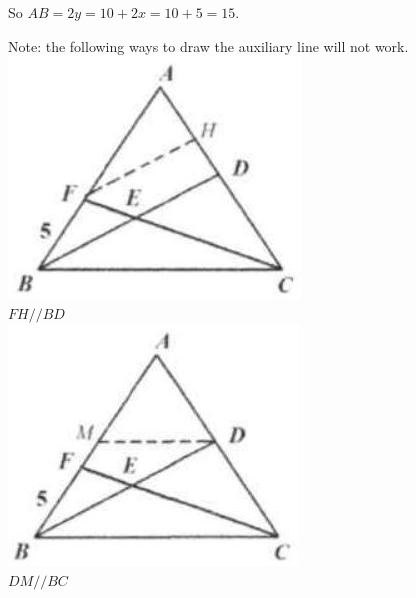 \documentclass[10pt]{article}
\begin{document}
So \(A B=2 y=10+2 x=10+5=15\).

Note: the following ways to draw the auxiliary line will not work.\\
\includegraphics[max width=\textwidth, center]{2025_04_17_97bc1f7e44d93c271a88g-103}\\
\(F H / / B D\)\\
\includegraphics[max width=\textwidth, center]{2025_04_17_97bc1f7e44d93c271a88g-103(5)}\\
\(D M / / B C\)\\
\end{document}
